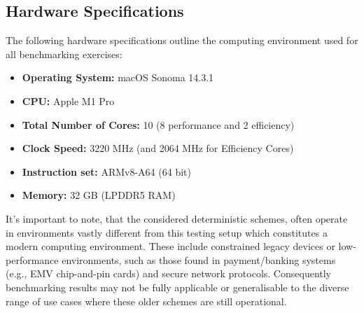 \documentclass[]{final_report}
\theoremstyle{definition}
\begin{document}
\subsection{Hardware Specifications}
The following hardware specifications outline the computing environment used for all benchmarking exercises:
\begin{itemize}

\item \textbf{Operating System:} macOS Sonoma 14.3.1
\item \textbf{CPU:} Apple M1 Pro
\item \textbf{Total Number of Cores:} 10 (8 performance and 2 efficiency)
\item \textbf{Clock Speed:} 3220 MHz (and 2064 MHz for Efficiency Cores)
\item \textbf{Instruction set:} ARMv8-A64 (64 bit)
\item \textbf{Memory:} 32 GB (LPDDR5 RAM)
\end{itemize}

It's important to note, that the considered deterministic schemes, often operate in environments vastly different from this testing setup which constitutes a modern computing environment. These include constrained legacy devices or low-performance environments, such as those found in payment/banking systems (e.g., EMV chip-and-pin cards) and secure network protocols.  Consequently benchmarking results may not be fully applicable or generalisable to the diverse range of use cases where these older schemes are still operational.  

\end{document}
